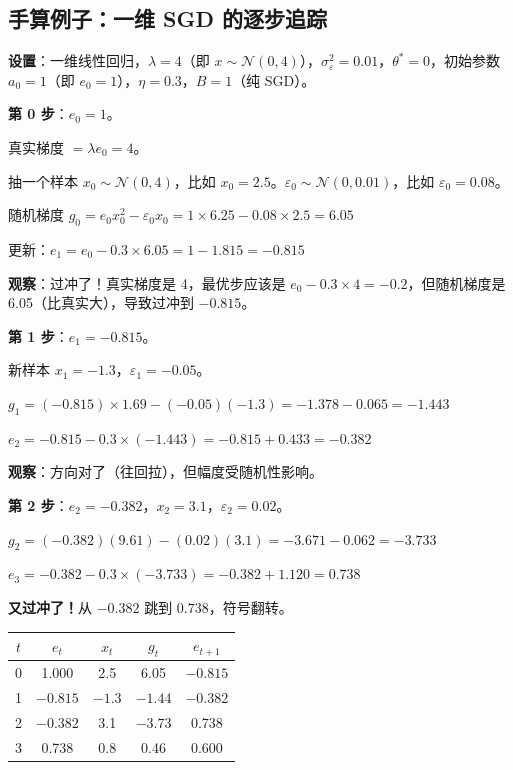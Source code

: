 \documentclass[12pt, a4paper]{ctexart}
\begin{document}
\subsection{手算例子：一维 SGD 的逐步追踪}

\textbf{设置}：一维线性回归，$\lambda = 4$（即 $x \sim \mathcal{N}(0,4)$），$\sigma_\varepsilon^2 = 0.01$，$\theta^* = 0$，初始参数 $a_0 = 1$（即 $e_0 = 1$），$\eta = 0.3$，$B = 1$（纯 SGD）。

\textbf{第 0 步}：$e_0 = 1$。

真实梯度 $= \lambda e_0 = 4$。

抽一个样本 $x_0 \sim \mathcal{N}(0,4)$，比如 $x_0 = 2.5$。$\varepsilon_0 \sim \mathcal{N}(0,0.01)$，比如 $\varepsilon_0 = 0.08$。

随机梯度 $g_0 = e_0 x_0^2 - \varepsilon_0 x_0 = 1 \times 6.25 - 0.08 \times 2.5 = 6.05$

更新：$e_1 = e_0 - 0.3 \times 6.05 = 1 - 1.815 = -0.815$

\textbf{观察}：过冲了！真实梯度是 4，最优步应该是 $e_0 - 0.3\times 4 = -0.2$，但随机梯度是 6.05（比真实大），导致过冲到 $-0.815$。

\textbf{第 1 步}：$e_1 = -0.815$。

新样本 $x_1 = -1.3$，$\varepsilon_1 = -0.05$。

$g_1 = (-0.815) \times 1.69 - (-0.05)(-1.3) = -1.378 - 0.065 = -1.443$

$e_2 = -0.815 - 0.3 \times (-1.443) = -0.815 + 0.433 = -0.382$

\textbf{观察}：方向对了（往回拉），但幅度受随机性影响。

\textbf{第 2 步}：$e_2 = -0.382$，$x_2 = 3.1$，$\varepsilon_2 = 0.02$。

$g_2 = (-0.382)(9.61) - (0.02)(3.1) = -3.671 - 0.062 = -3.733$

$e_3 = -0.382 - 0.3\times(-3.733) = -0.382 + 1.120 = 0.738$

\textbf{又过冲了！}从 $-0.382$ 跳到 $0.738$，符号翻转。

\begin{center}
\begin{tabular}{c|cccc}
$t$ & $e_t$ & $x_t$ & $g_t$ & $e_{t+1}$ \\
\hline
0 & 1.000 & 2.5 & 6.05 & $-0.815$ \\
1 & $-0.815$ & $-1.3$ & $-1.44$ & $-0.382$ \\
2 & $-0.382$ & 3.1 & $-3.73$ & 0.738 \\
3 & 0.738 & 0.8 & 0.46 & 0.600 \\
\end{tabular}
\end{center}
\end{document}

